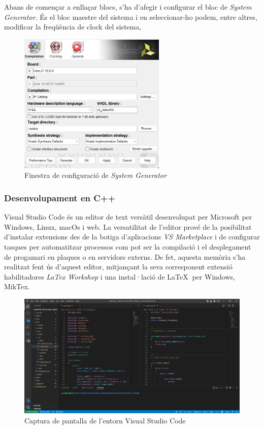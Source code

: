 {    Abans de començar a enllaçar blocs, s'ha d'afegir i configurar el bloc
    de \emph{System Generator}. És el bloc maestre del sistema i en
    seleccionar-ho podem, entre altres, modificar la freqüència de clock
    del sistema, 

    \begin{figure}[!htb]
        \centering
        \captionsetup{justification=centering,margin=1.5cm}
        \includegraphics[width=7cm]
            { img/model_composer/sysgen_window.png }
        \caption{ Finestra de configuració de \emph{System Generator} }
    \end{figure}
}

\subsubsection{ Desenvolupament en C++ }
{ 
    Visual Studio Code és un editor de text versàtil desenvolupat per
    Microsoft per Windows, Linux, macOs i web. La versatilitat de l'editor
    prové de la posibilitat d'instalar extensions des de la botiga
    d'aplicacions \emph{VS Marketplace} i de configurar tasques per
    automatitzar processos com pot ser la compilació i el desplegament de
    progamari en plaques o en servidors externs. De fet, aquesta memòria
    s'ha realitzat fent ús d'aquest editor, mitjançant la seva corresponent
    extensió habilitadores \emph{LaTex Workshop} i una instal·lació de
    \LaTeX $\ $ per Windows, MikTex.

    \begin{figure}[!htb]
        \centering
        \captionsetup{justification=centering,margin=1.5cm}
        \includegraphics[width=15cm]
            { img/4_implementacio/VSCode.png }
        \caption{ Captura de pantalla de l'entorn Visual Studio Code }
    \end{figure}
}